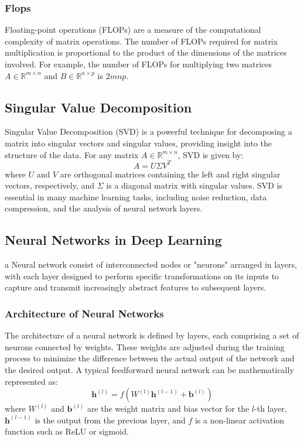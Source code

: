     \subsubsection{Flops}
    Floating-point operations (FLOPs) are a measure of the computational complexity of matrix operations. The number of FLOPs required for matrix multiplication is proportional to the product of the dimensions of the matrices involved. For example, the number of FLOPs for multiplying two matrices $A \in \mathbb{R}^{m \times n}$ and $B \in \mathbb{R}^{n \times p}$ is $2mnp$.

\subsection{Singular Value Decomposition}
    Singular Value Decomposition (SVD) is a powerful technique for decomposing a matrix into singular vectors and singular values, providing insight into the structure of the data. For any matrix $A \in \mathbb{R}^{m \times n}$, SVD is given by:
    \begin{equation}
        A = U\Sigma V^T
        \label{eq:svd}
    \end{equation}
    where $U$ and $V$ are orthogonal matrices containing the left and right singular vectors, respectively, and $\Sigma$ is a diagonal matrix with singular values. SVD is essential in many machine learning tasks, including noise reduction, data compression, and the analysis of neural network layers.

\subsection{Neural Networks in Deep Learning}
   a Neural network consist of interconnected nodes or "neurons" arranged in layers, with each layer designed to perform specific transformations on its inputs to capture and transmit increasingly abstract features to subsequent layers.
    
    \subsubsection{Architecture of Neural Networks}
    The architecture of a neural network is defined by layers, each comprising a set of neurons connected by weights. These weights are adjusted during the training process to minimize the difference between the actual output of the network and the desired output. A typical feedforward neural network can be mathematically represented as:
    \begin{equation}
        \mathbf{h}^{(l)} = f(W^{(l)}\mathbf{h}^{(l-1)} + \mathbf{b}^{(l)})
    \end{equation}
    where $W^{(l)}$ and $\mathbf{b}^{(l)}$ are the weight matrix and bias vector for the $l$-th layer, $\mathbf{h}^{(l-1)}$ is the output from the previous layer, and $f$ is a non-linear activation function such as ReLU or sigmoid.
    
